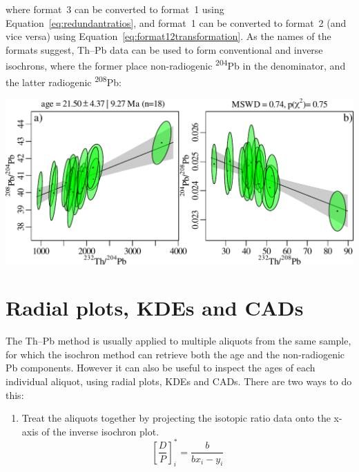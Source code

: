 \begin{refsection}
\noindent where format~3 can be converted to format~1 using
Equation~\ref{eq:redundantratios}, and format~1 can be converted to
format~2 (and vice versa) using
Equation~\ref{eq:format12transformation}. As the names of the formats
suggest, Th--Pb data can be used to form conventional and inverse
isochrons, where the former place non-radiogenic
\textsuperscript{204}Pb in the denominator, and the latter radiogenic
\textsuperscript{208}Pb:\\

\noindent\begin{minipage}[t][][b]{.7\linewidth}
\includegraphics[width=\textwidth]{../figures/ThPb.pdf}
\end{minipage}
\begin{minipage}[t][][t]{.3\linewidth}
  \label{fig:agediscordance}
\end{minipage}

\section{Radial plots, KDEs and CADs}\label{it:ThPbPbradial}

The Th--Pb method is usually applied to multiple aliquots from the
same sample, for which the isochron method can retrieve both the age
and the non-radiogenic Pb components. However it can also be useful to
inspect the ages of each individual aliquot, using radial plots, KDEs
and CADs. There are two ways to do this:

\begin{enumerate}
  \item Treat the aliquots together by projecting the isotopic ratio
    data onto the x-axis of the inverse isochron plot.
    \begin{equation}
      \left[\frac{D}{P}\right]_i^\ast = \frac{b}{b x_i - y_i}
      \label{eq:DP*inverse}
    \end{equation}
    

\end{enumerate}
\end{refsection}
